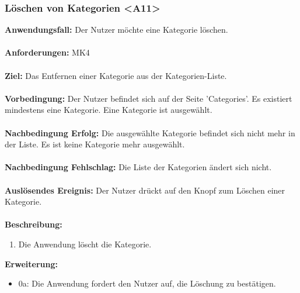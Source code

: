 \documentclass[parskip=full]{scrartcl} %
\begin{document}
\subsubsection*{Löschen von Kategorien <A11>}
\textbf{Anwendungsfall:} Der Nutzer möchte eine Kategorie löschen.\\\\
\textbf{Anforderungen:} MK4\\\\
\textbf{Ziel:} Das Entfernen einer Kategorie aus der Kategorien-Liste.\\\\
\textbf{Vorbedingung:} Der Nutzer befindet sich auf der Seite 'Categories'. Es existiert mindestens eine Kategorie. Eine Kategorie ist ausgewählt.\\\\
\textbf{Nachbedingung Erfolg:} Die ausgewählte Kategorie befindet sich nicht mehr in der Liste. Es ist keine Kategorie mehr ausgewählt.\\\\
\textbf{Nachbedingung Fehlschlag:} Die Liste der Kategorien ändert sich nicht.\\\\
\textbf{Auslösendes Ereignis:} Der Nutzer drückt auf den Knopf zum Löschen einer Kategorie. \\\\
\textbf{Beschreibung:}
\begin{enumerate}
    \item Die Anwendung löscht die Kategorie.
\end{enumerate}
\textbf{Erweiterung:}
\begin{itemize}
    \item 0a: Die Anwendung fordert den Nutzer auf, die Löschung zu bestätigen.
\end{itemize}
\newpage
\end{document}
